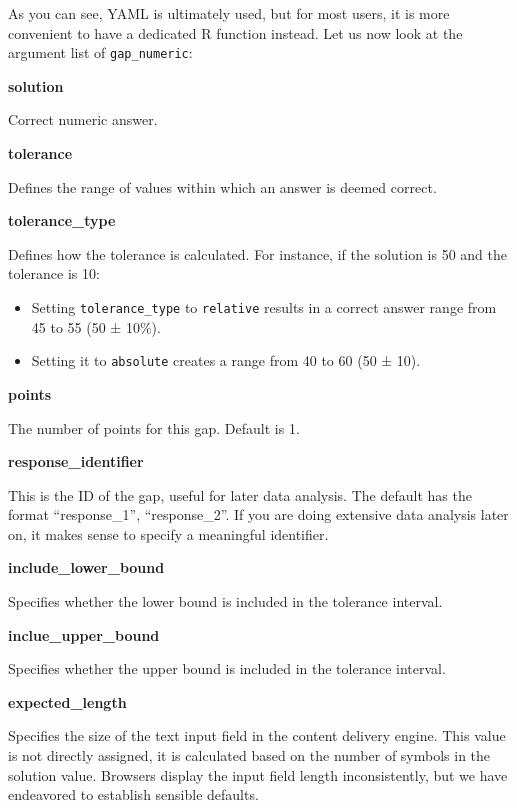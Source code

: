 \documentclass[twoside]{tufte-book}
\providecommand{\tightlist}{%
  \setlength{\itemsep}{0pt}\setlength{\parskip}{0pt}}
\begin{document}
As you can see, YAML is ultimately used, but for most users, it is more convenient to have a dedicated R function instead. Let us now look at the argument list of \texttt{gap\_numeric}:

\noindent\textbf{solution}\label{solution}

Correct numeric answer.

\noindent\textbf{tolerance}\label{tolerance}

Defines the range of values within which an answer is deemed correct.

\noindent\textbf{tolerance\_type}\label{tolerance_type}

Defines how the tolerance is calculated. For instance, if the solution is 50 and the tolerance is 10:

\begin{itemize}
\tightlist
\item
  Setting \texttt{tolerance\_type} to \texttt{relative} results in a correct answer range from 45 to 55 (50 ± 10\%).
\item
  Setting it to \texttt{absolute} creates a range from 40 to 60 (50 ± 10).
\end{itemize}

\noindent\textbf{points}\label{points-2}

The number of points for this gap. Default is 1.

\noindent\textbf{response\_identifier}\label{response_identifier}

This is the ID of the gap, useful for later data analysis. The default has the format ``response\_1'', ``response\_2''. If you are doing extensive data analysis later on, it makes sense to specify a meaningful identifier.

\noindent\textbf{include\_lower\_bound}\label{include_lower_bound}

Specifies whether the lower bound is included in the tolerance interval.

\noindent\textbf{inclue\_upper\_bound}\label{inclue_upper_bound}

Specifies whether the upper bound is included in the tolerance interval.

\noindent\textbf{expected\_length}\label{expected_length}

Specifies the size of the text input field in the content delivery engine. This value is not directly assigned, it is calculated based on the number of symbols in the solution value. Browsers display the input field length inconsistently, but we have endeavored to establish sensible defaults.
\end{document}
